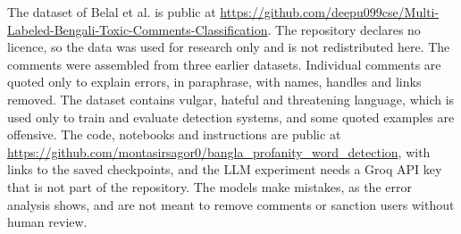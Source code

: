 The dataset of Belal et al. \cite{belal2023toxic} is public at \url{https://github.com/deepu099cse/Multi-Labeled-Bengali-Toxic-Comments-Classification}. The repository declares no licence, so the data was used for research only and is not redistributed here. The comments were assembled from three earlier datasets. Individual comments are quoted only to explain errors, in paraphrase, with names, handles and links removed. The dataset contains vulgar, hateful and threatening language, which is used only to train and evaluate detection systems, and some quoted examples are offensive. The code, notebooks and instructions are public at \url{https://github.com/montasirsagor0/bangla_profanity_word_detection}, with links to the saved checkpoints, and the LLM experiment needs a Groq API key that is not part of the repository. The models make mistakes, as the error analysis shows, and are not meant to remove comments or sanction users without human review.
